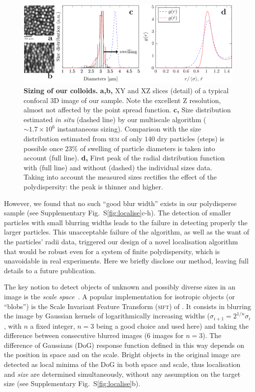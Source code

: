 \documentclass[prl,twocolumn,notitlepage]{revtex4-1}
\begin{document}
\begin{figure}
\begin{center}
\includegraphics{generate_figures-figure6.pdf}
\end{center}
	\caption{\textbf{Sizing of our colloids.} \textbf{a,b,} XY and XZ slices (detail) of a typical confocal 3D image of our sample. Note the excellent Z resolution, almost not affected by the point spread function. \textbf{c,} Size distribution estimated \emph{in situ} (dashed line) by our multiscale algorithm ($\sim 1.7\times 10^6$ instantaneous sizing). Comparison with the size distribution estimated from \textsc{sem} of only $140$ dry particles (steps) is possible once $23\%$ of swelling of particle diameters is taken into account (full line). \textbf{d,} First peak of the radial distribution function with (full line) and without (dashed) the individual sizes data. Taking into account the measured sizes rectifies the effect of the polydispersity: the peak is thinner and higher.}
	\label{fig:sizing}
\end{figure}

However, we found that no such ``good blur width'' exists in our polydisperse sample (see Supplementary Fig.~S\ref{fig:localise}c-h). The detection of smaller particles with small blurring widths leads to the failure in detecting properly the larger particles. This unacceptable failure of the \citet{Crocker1996} algorithm, as well as the want of the particles' radii data, triggered our design of a novel localisation algorithm that would be robust even for a system of finite polydispersity, which is unavoidable in real experiments. Here we briefly disclose our method, leaving full details to a future publication.

The key notion to detect objects of unknown and possibly diverse sizes in an image is the \emph{scale space}~\cite{Lindeberg1993}. A popular implementation for isotropic objects (or ``blobs'') is the Scale Invariant Feature Transform (\textsc{sift}) of \citet{Lowe2004}. It consists  in blurring the image by Gaussian kernels of logarithmically increasing widths ($\sigma_{i+1} = 2^{1/n} \sigma_i$, with $n$ a fixed integer, $n=3$ being a good choice and used here) and taking the difference between consecutive blurred images (6 images for $n=3$). The difference of Gaussians (DoG) response function defined in this way depends on the position in space and on the scale. Bright objects in the original image are detected as local minima of the DoG in both space and scale, thus localisation and \emph{size} are determined simultaneously, without any assumption on the target size (see Supplementary Fig.~S\ref{fig:localise}b).
\end{document}
